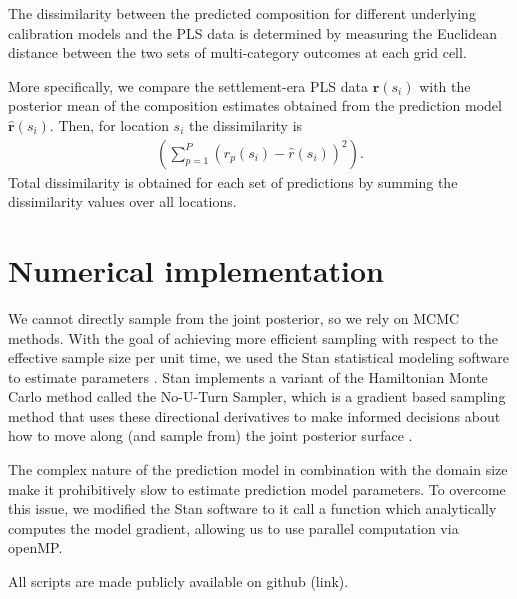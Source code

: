 \documentclass[12pt]{article}
\begin{document}
The dissimilarity between the predicted composition for different
underlying calibration models and the PLS data is determined by
measuring the Euclidean distance between the two sets of
multi-category outcomes at each grid cell.

More specifically, we compare the settlement-era PLS data
$\bm{r}(s_i)$ with the posterior mean of the composition estimates
obtained from the prediction model $\hat{\bm{r}}(s_i)$. Then, for
location $s_i$ the dissimilarity is
\begin{align*}
\left( \sum_{p=1}^{P} (r_p(s_i) - \hat{r}(s_i))^2 \right).
\end{align*}
Total dissimilarity is obtained for each set of predictions by summing
the dissimilarity values over all locations.

\section{Numerical implementation}
\label{sec:imp}

We cannot directly sample from the joint posterior, so we rely on MCMC
methods. With the goal of achieving more efficient sampling with
respect to the effective sample size per unit time, we used the Stan
statistical modeling software to estimate parameters
\citep{stan-software:2014}. Stan implements a variant of the
Hamiltonian Monte Carlo method called the No-U-Turn Sampler, which is
a gradient based sampling method that uses these directional
derivatives to make informed decisions about how to move along (and
sample from) the joint posterior surface \citep{hoffman2011nuts}. 

The complex nature of the prediction model in combination with the
domain size make it prohibitively slow to estimate prediction model
parameters. To overcome this issue, we modified the Stan software to
it call a function which analytically computes the model gradient,
allowing us to use parallel computation via openMP.

All scripts are made publicly available on github (link).


\end{document}
